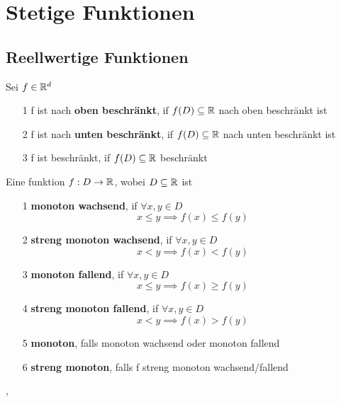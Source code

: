 \section{Stetige Funktionen}
\subsection{Reellwertige Funktionen}
 Sei \( f \in \mathbb{R}^d\)
\begin{enumerate}
    \item [1] f ist nach \textbf{oben beschränkt}, if \(f(D) \subseteq \mathbb{R} \) nach oben beschränkt ist
    \item [2] f ist nach \textbf{unten beschränkt}, if \(f(D) \subseteq \mathbb{R} \) nach unten beschränkt ist
    \item [3] f ist beschränkt, if \(f(D) \subseteq \mathbb{R} \) beschränkt
\end{enumerate}
 Eine funktion \(f: D \rightarrow \mathbb{R}\), wobei \(D \subseteq \mathbb{R}\) ist
\begin{enumerate}
    \item [1] \textbf{monoton wachsend}, if \(\forall x,y \in D\)
    \[x \leq y \implies f(x) \leq f(y) \]
    \item [2] \textbf{streng monoton wachsend}, if \(\forall x,y \in D\)
    \[x < y \implies f(x) < f(y)\]
    \item [3] \textbf{monoton fallend}, if \(\forall x,y \in D\)
    \[x \leq y \implies f(x) \geq f(y)\]
    \item [4] \textbf{streng monoton fallend}, if \(\forall x,y \in D\)
    \[x < y \implies f(x) > f(y)\]
    \item [5] \textbf{monoton}, falls monoton wachsend oder monoton fallend
    \item [6] \textbf{streng monoton}, falls f streng monoton wachsend/fallend
\end{enumerate}
\sep
